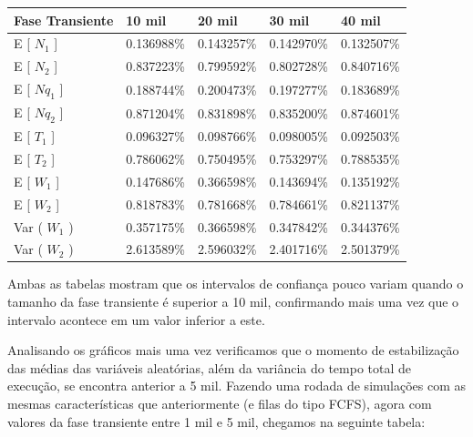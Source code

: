 \documentclass[a4paper,10pt]{article}
\begin{document}
\begin{center}
\begin{tabular} { | l | l | l | l | l | }
    \hline
    Fase Transiente & 10 mil     & 20 mil     & 30 mil     & 40 mil \\ \hline
    E [ $N_1$ ]     & 0.136988\% & 0.143257\% & 0.142970\% & 0.132507\% \\ \hline
    E [ $N_2$ ]     & 0.837223\% & 0.799592\% & 0.802728\% & 0.840716\% \\ \hline
    E [ $Nq_1$ ]    & 0.188744\% & 0.200473\% & 0.197277\% & 0.183689\% \\ \hline
    E [ $Nq_2$ ]    & 0.871204\% & 0.831898\% & 0.835200\% & 0.874601\% \\ \hline
    E [ $T_1$ ]     & 0.096327\% & 0.098766\% & 0.098005\% & 0.092503\% \\ \hline
    E [ $T_2$ ]     & 0.786062\% & 0.750495\% & 0.753297\% & 0.788535\% \\ \hline
    E [ $W_1$ ]     & 0.147686\% & 0.366598\% & 0.143694\% & 0.135192\% \\ \hline
    E [ $W_2$ ]     & 0.818783\% & 0.781668\% & 0.784661\% & 0.821137\% \\ \hline
    Var ( $W_1$ )   & 0.357175\% & 0.366598\% & 0.347842\% & 0.344376\% \\ \hline
    Var ( $W_2$ )   & 2.613589\% & 2.596032\% & 2.401716\% & 2.501379\% \\ \hline
\end{tabular}
\end{center}

    Ambas as tabelas mostram que os intervalos de confiança pouco variam quando o tamanho da fase transiente é superior a 10 mil, confirmando mais uma vez que o intervalo acontece em um valor inferior a este.

    Analisando os gráficos mais uma vez verificamos que o momento de estabilização das médias das variáveis aleatórias, além da variância do tempo total de execução, se encontra anterior a 5 mil. Fazendo uma rodada de simulações com as mesmas características que anteriormente (e filas do tipo FCFS), agora com valores da fase transiente entre 1 mil e 5 mil, chegamos na seguinte tabela:
\end{document}
